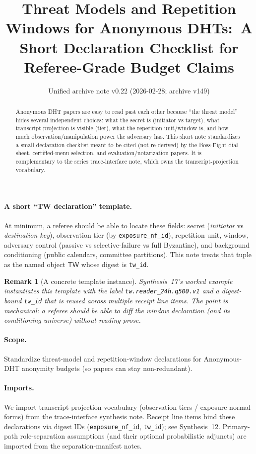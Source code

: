 \documentclass[11pt]{article}
\title{Threat Models and Repetition Windows for Anonymous DHTs:\ A Short Declaration Checklist for Referee-Grade Budget Claims}
\author{}
\date{Unified archive note v0.22 (2026-02-28; archive v149)}
\newtheorem{remark}{Remark}
\begin{document}
\maketitle

\begin{abstract}
Anonymous DHT papers are easy to read past each other because ``the threat model'' hides several independent choices:
what the secret is (initiator vs target), what transcript projection is visible (tier), what the repetition unit/window is, and how much observation/manipulation power the adversary has.
This short note standardizes a small declaration checklist meant to be cited (not re-derived) by the Boss-Fight dial sheet, certified-menu selection, and evaluation/notarization papers.
It is complementary to the series trace-interface note, which owns the transcript-projection vocabulary.
\end{abstract}


\paragraph{A short ``TW declaration'' template.}
At minimum, a referee should be able to locate these fields: secret (\emph{initiator} vs \emph{destination key}), observation tier (by \texttt{exposure\_nf\_id}), repetition unit, window, adversary control (passive vs selective-failure vs full Byzantine), and background conditioning (public calendars, committee partitions).
This note treats that tuple as the named object \(\mathsf{TW}\) whose digest is \texttt{tw\_id}.


\begin{remark}[A concrete template instance]
Synthesis~17's worked example instantiates this template with the label
\texttt{tw.reader\_24h.q500.v1} and a digest-bound \texttt{tw\_id} that is reused across multiple receipt line items.
The point is mechanical: a referee should be able to diff the window declaration (and its conditioning universe) without reading prose.\cite{series:workedexample,series:receiptitems}
\end{remark}


\paragraph{Scope.}
Standardize threat-model and repetition-window declarations for Anonymous-DHT anonymity budgets (so papers can stay non-redundant).

\paragraph{Imports.}
We import transcript-projection vocabulary (observation tiers / exposure normal forms) from the trace-interface synthesis note.\cite{series:traceifaces}
Receipt line items bind these declarations via digest IDs (\texttt{exposure\_nf\_id}, \texttt{tw\_id}); see Synthesis~12.\cite{series:receiptitems}
Primary-path role-separation assumptions (and their optional probabilistic adjuncts) are imported from the separation-manifest notes.\cite{series:primarysepmanifest,series:probsep}
\end{document}

